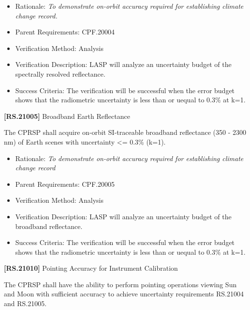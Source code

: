 \documentclass[12pt,oneside,oldfontcommands]{memoir}
\begin{document}
\begin{itemize}
\item{} Rationale: \emph{To demonstrate on-orbit accuracy required for establishing climate change record.}

\item{} Parent Requirements: \gls{CPF}.20004

\item{} Verification Method: Analysis

\item{} Verification Description: \gls{LASP} will analyze an uncertainty budget of the spectrally resolved reflectance.

\item{} Success Criteria: The verification will be successful when the error budget shows that the radiometric uncertainty is less than or uequal to 0.3\% at k=1.

\end{itemize}

\textbf{[RS.21005]} Broadband Earth Reflectance

The \gls{CPRSP} shall acquire on-orbit \gls{SI}-traceable broadband reflectance (350 - 2300 nm) of Earth scenes with uncertainty <= 0.3\% (k=1).

\begin{itemize}
\item{} Rationale: \emph{To demonstrate on-orbit accuracy required for establishing climate change record}

\item{} Parent Requirements: \gls{CPF}.20005

\item{} Verification Method: Analysis

\item{} Verification Description: \gls{LASP} will analyze an uncertainty budget of the broadband reflectance.

\item{} Success Criteria: The verification will be successful when the error budget shows that the radiometric uncertainty is less than or uequal to 0.3\% at k=1.

\end{itemize}

\textbf{[RS.21010]} Pointing Accuracy for Instrument Calibration

The \gls{CPRSP} shall have the ability to perform \gls{point}ing operations viewing Sun and Moon with sufficient accuracy to achieve uncertainty requirements \gls{RS}.21004 and \gls{RS}.21005.
\end{document}

